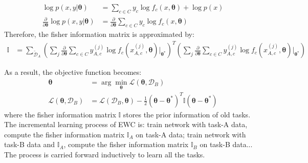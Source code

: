 \documentclass{article}
\begin{document}
\begin{equation}
\begin{split}
\log p(x, y|\boldsymbol{\theta}) &= 
\sum_{c\in C} y_c\log f_c(x, \boldsymbol{\theta}) + \log p(x) \\
\frac{\partial}{\partial \boldsymbol{\theta}} \log p(x, y|\boldsymbol{\theta}) &=
\frac{\partial}{\partial \boldsymbol{\theta}}\sum_{c\in C} y_c\log f_c(x, \boldsymbol{\theta})
\end{split}
\end{equation}
Therefore, the fisher information matrix is approximated by:
\begin{equation}
\begin{split}
\mathbb{I} &= 
\sum_{\tilde{\mathcal D}_A}
(\sum_j \frac{\partial}{\partial \boldsymbol{\theta}}\sum_{c\in C} y_{A,c}^{(j)}\log f_c(x_{A,c}^{(j)}, \boldsymbol{\theta}) |_{\boldsymbol{\theta^*}})^T
(\sum_j \frac{\partial}{\partial \boldsymbol{\theta}}\sum_{c\in C} y_{A,c}^{(j)}\log f_c(x_{A,c}^{(j)}, \boldsymbol{\theta})|_{\boldsymbol{\theta^*}})
\end{split}
\end{equation}

As a result, the objective function becomes:
\begin{equation}
\begin{split}
    \boldsymbol{\theta} & = \arg \min_{\boldsymbol{\theta}} \mathcal L(\boldsymbol{\theta}, \mathcal D_B) \\
    \mathcal L(\boldsymbol{\theta}, \mathcal D_B)  &= \mathcal L(\mathcal D_B, \boldsymbol{\theta}) 
    -\frac{1}{2}(\boldsymbol{\theta} - \boldsymbol{\theta^*})^T\mathbb{I} (\boldsymbol{\theta} - \boldsymbol{\theta^*})
    \label{eq:final_objective_function_cls}
\end{split}
\end{equation}
where the fisher information matrix $\mathbb{I}$ stores the prior information of old tasks.
The incremental learning process of EWC
is: train network with task-A data, compute the fisher information matrix $\mathbb{I}_A$ on task-A data;
train network with task-B data and $\mathbb{I}_A$, compute the fisher information matrix $\mathbb{I}_B$ on task-B data...
The process is carried forward inductively to learn all the tasks.
\end{document}
